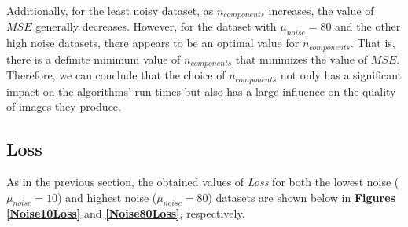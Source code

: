 \documentclass[12pt]{article}
\begin{document}
Additionally, for the least noisy dataset, as $n_{components}$ increases, the value of $MSE$ generally decreases. However, for the dataset with $\mu_{noise}=80$ and the other high noise datasets, there appears to be an optimal value for $n_{components}$. That is, there is a definite minimum value of $n_{components}$ that minimizes the value of $MSE$. Therefore, we can conclude that the choice of $n_{components}$ not only has a significant impact on the algorithms' run-times but also has a large influence on the quality of images they produce.

\subsection{Loss}\label{5.3}

As in the previous section, the obtained values of \textit{Loss} for both the lowest noise ($\mu_{noise}=10$) and highest noise ($\mu_{noise}=80$) datasets are shown below in \textbf{\hyperref[Noise10Loss]{Figures \ref*{Noise10Loss}}} and \textbf{\hyperref[Noise80Loss]{\ref*{Noise80Loss}}}, respectively.
\end{document}
